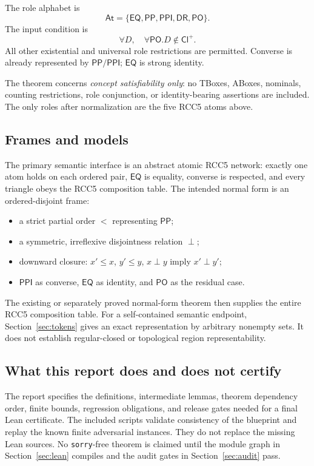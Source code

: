 \documentclass[11pt]{article}
\newcommand{\PP}{\mathsf{PP}}
\newcommand{\PPI}{\mathsf{PPI}}
\newcommand{\PO}{\mathsf{PO}}
\newcommand{\DR}{\mathsf{DR}}
\newcommand{\EQ}{\mathsf{EQ}}
\newcommand{\Cl}{\mathsf{Cl}^{+}}
\newcommand{\At}{\mathsf{At}}
\begin{document}
The role alphabet is
\[
  \At=\{\EQ,\PP,\PPI,\DR,\PO\}.
\]
The input condition is
\[
  \forall D,\quad \forall\PO.D\notin\Cl.
\]
All other existential and universal role restrictions are permitted. Converse is already
represented by $\PP/\PPI$; $\EQ$ is strong identity.

The theorem concerns \emph{concept satisfiability only}: no TBoxes, ABoxes, nominals,
counting restrictions, role conjunction, or identity-bearing assertions are included.
The only roles after normalization are the five RCC5 atoms above.

\subsection{Frames and models}

The primary semantic interface is an abstract atomic RCC5 network: exactly one atom holds
on each ordered pair, $\EQ$ is equality, converse is respected, and every triangle obeys
the RCC5 composition table. The intended normal form is an ordered-disjoint frame:

\begin{itemize}
  \item a strict partial order $<$ representing $\PP$;
  \item a symmetric, irreflexive disjointness relation $\perp$;
  \item downward closure:
    $x'\leq x$, $y'\leq y$, $x\perp y$ imply $x'\perp y'$;
  \item $\PPI$ as converse, $\EQ$ as identity, and $\PO$ as the residual case.
\end{itemize}

The existing or separately proved normal-form theorem then supplies the entire RCC5
composition table. For a self-contained semantic endpoint, Section~\ref{sec:tokens}
gives an exact representation by arbitrary nonempty sets. It does not establish
regular-closed or topological region representability.

\subsection{What this report does and does not certify}

The report specifies the definitions, intermediate lemmas, theorem dependency order,
finite bounds, regression obligations, and release gates needed for a final Lean
certificate. The included scripts validate consistency of the blueprint and replay the
known finite adversarial instances. They do not replace the missing Lean sources. No
\texttt{sorry}-free theorem is claimed until the module graph in
Section~\ref{sec:lean} compiles and the audit gates in Section~\ref{sec:audit} pass.
\end{document}
